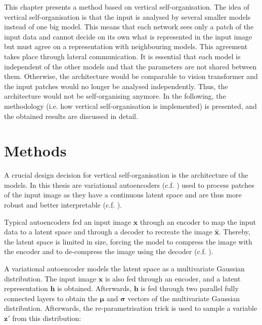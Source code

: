 This chapter presents a method based on vertical self-organisation.
The idea of vertical self-organisation is that the input is analysed by several smaller models instead of one big model.
This means that each network sees only a patch of the input data and cannot decide on its own what is represented in the input image but must agree on a representation with neighbouring models.
This agreement takes place through lateral communication.
It is essential that each model is independent of the other models and that the parameters are not shared between them. Otherwise, the architecture would be comparable to vision transformer  and the input patches would no longer be analysed independently. Thus, the architecture would not be self-organising anymore. In the following, the methodology (i.e. how vertical self-organisation is implemented) is presented, and the obtained results are discussed in detail.

\section{Methods}
A crucial design decision for vertical self-organisation is the architecture of the models.
In this thesis are variational autoencoders  (c.f. ) used to process patches of the input image as they have a continuous latent space and are thus more robust and better interpretable (c.f. ).

Typical autoencoders fed an input image $\boldsymbol{x}$ through an encoder to map the input data to a latent space and through a decoder to recreate the image $\boldsymbol{\hat{x}}$. Thereby, the latent space is limited in size, forcing the model to compress the image with the encoder and to de-compress the image using the decoder (c.f. ).

A variational autoencoder models the latent space as a multivariate Gaussian distribution. The input image $\boldsymbol{x}$ is also fed through an encoder, and a latent representation $\boldsymbol{h}$ is obtained. Afterwards, $\boldsymbol{h}$ is fed through two parallel fully connected layers to obtain the $\boldsymbol{\mu}$ and $\boldsymbol{\sigma}$ vectors of the multivariate Gaussian distribution. Afterwards, the re-parametrisation trick is used to sample a variable $\boldsymbol{z}'$ from this distribution:

